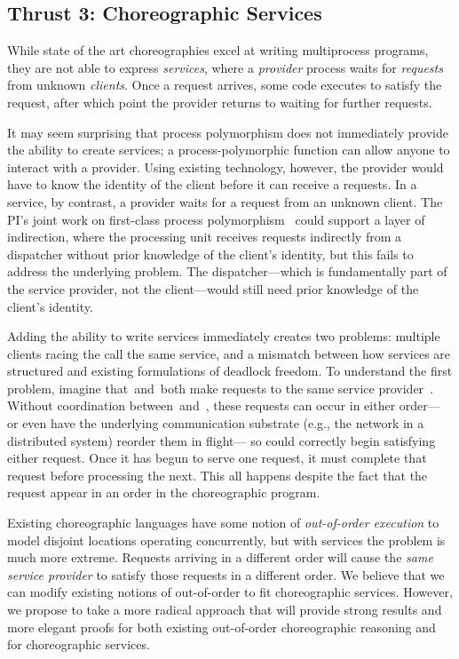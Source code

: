 \subsection{Thrust 3: Choreographic Services}
\label{sec:t3}

While state of the art choreographies excel at writing multiprocess programs, they are not able to express \emph{services},
where a \emph{provider} process waits for \emph{requests} from unknown \emph{clients}.
Once a request arrives, some code executes to satisfy the request, after which point the provider returns to waiting for further requests.

It may seem surprising that process polymorphism does not immediately provide the ability to create services;
a process-polymorphic function can allow anyone to interact with a provider.
Using existing technology, however, the provider would have to know the identity of the client before it can receive a requests.
In a service, by contrast, a provider waits for a request from an unknown client.
The PI's joint work on first-class process polymorphism~\cite{SamuelsonHC25} could support a layer of indirection,
where the processing unit receives requests indirectly from a dispatcher without prior knowledge of the client's identity,
but this fails to address the underlying problem.
The dispatcher---which is fundamentally part of the service provider, not the client---would still need prior knowledge of the client's identity.

Adding the ability to write services immediately creates two problems:
multiple clients racing the call the same service,
and a mismatch between how services are structured and existing formulations of deadlock freedom.
To understand the first problem, imagine that~\Alice and~\Bob both make requests to the same service provider~\Server.
Without coordination between~\Alice and~\Bob, these requests can occur in either order---%
or even have the underlying communication substrate (e.g., the network in a distributed system) reorder them in flight---%
so \Server could correctly begin satisfying either request.
Once it has begun to serve one request, it must complete that request before processing the next.
This all happens despite the fact that the request appear in an order in the choreographic program.

Existing choreographic languages have some notion of \emph{out-of-order execution}
to model disjoint locations operating concurrently, but with services the problem is much more extreme.
Requests arriving in a different order will cause the \emph{same service provider} to satisfy those requests in a different order.
We believe that we can modify existing notions of out-of-order to fit choreographic services.
However, we propose to take a more radical approach that will provide strong results and more elegant proofs
for both existing out-of-order choreographic reasoning and for choreographic services.


